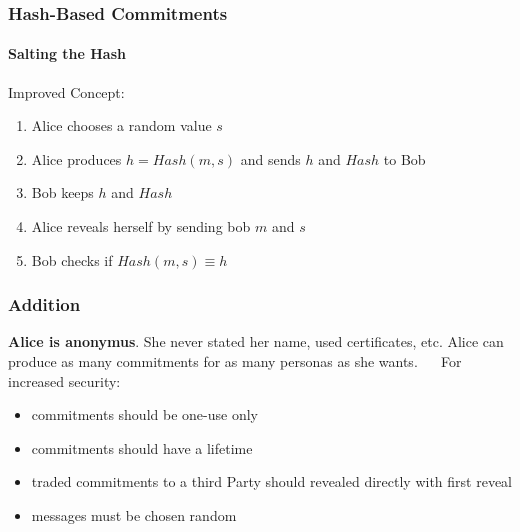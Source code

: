 \begin{frame}
	\frametitle{Hash-Based Commitments}
	\framesubtitle{Salting the Hash}
	Improved Concept: 
	\begin{LARGE}
		\begin{enumerate}
			\item Alice chooses a random value $s$
			\item Alice produces $h = Hash(m,s)$ and sends $h$ and $Hash$ to Bob
			\item Bob keeps $h$ and $Hash$
			\item Alice reveals herself by sending bob $m$ and $s$
			\item Bob checks if $Hash(m,s) \equiv h$
		\end{enumerate}
	\end{LARGE}
\end{frame}

\begin{frame}
	\frametitle{Addition}
	\textbf{Alice is anonymus}. She never stated her name, used certificates, etc. \newline
	Alice can produce as many commitments for as many personas as she wants.  
	~\newline ~\newline
	For increased security: 
	\begin{itemize}
		\item commitments should be one-use only
		\item commitments should have a lifetime
		\item traded commitments to a third Party should revealed directly with first reveal
		\item messages must be chosen random
	\end{itemize}
\end{frame}